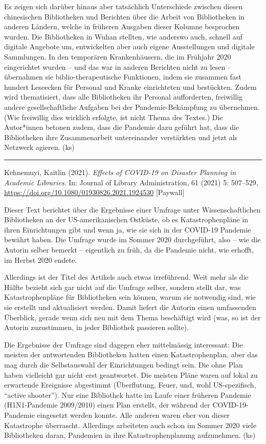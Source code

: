 \documentclass[a4paper,
fontsize=11pt,
oneside,
numbers=noperiodatend,
parskip=half-,
bibliography=totoc,
final
]{scrartcl}
\begin{document}
Es zeigen sich darüber hinaus aber tatsächlich Unterschiede zwischen
diesen chinesischen Bibliotheken und Berichten über die Arbeit von
Bibliotheken in anderen Ländern, welche in früheren Ausgaben dieser
Kolumne besprochen wurden. Die Bibliotheken in Wuhan stellten, wie
anderswo auch, schnell auf digitale Angebote um, entwickelten aber auch
eigene Ausstellungen und digitale Sammlungen. In den temporären
Krankenhäusern, die im Frühjahr 2020 eingerichtet wurden -- und das war
in anderen Berichten nicht zu lesen -- übernahmen sie
biblio-therapeutische Funktionen, indem sie zusammen fast hundert
Leseecken für Personal und Kranke einrichteten und bestückten. Zudem
wird thematisiert, dass alle Bibliotheken ihr Personal aufforderten,
freiwillig andere gesellschaftliche Aufgaben bei der Pandemie-Bekämpfung
zu übernehmen. (Wie freiwillig dies wirklich erfolgte, ist nicht Thema
des Textes.) Die Autor*innen betonen zudem, dass die Pandemie dazu
geführt hat, dass die Bibliotheken ihre Zusammenarbeit untereinander
verstärkten und jetzt als Netzwerk agieren. (ks)

\begin{center}\rule{0.5\linewidth}{0.5pt}\end{center}

Kehnemuyi, Kaitlin (2021). \emph{Effects of COVID-19 on Disaster
Planning in Academic Libraries}. In: Journal of Library Administration,
61 (2021) 5: 507--529,
\url{https://doi.org/10.1080/01930826.2021.1924530} {[}Paywall{]}

Dieser Text berichtet über die Ergebnisse einer Umfrage unter
Wissenschaftlichen Bibliotheken an der US-amerikanischen Ostküste, ob es
Katastrophenpläne in ihren Einrichtungen gibt und wenn ja, wie sie sich
in der COVID-19 Pandemie bewährt haben. Die Umfrage wurde im Sommer 2020
durchgeführt, also -- wie die Autorin selber bemerkt -- eigentlich zu
früh, da die Pandemie nicht, wie erhofft, im Herbst 2020 endete.

Allerdings ist der Titel des Artikels auch etwas irreführend. Weit mehr
als die Hälfte bezieht sich gar nicht auf die Umfrage selber, sondern
stellt dar, was Katastrophenpläne für Bibliotheken sein können, warum
sie notwendig sind, wie sie erstellt und aktualisiert werden. Damit
liefert die Autorin einen umfassenden Überblick, gerade wenn sich neu
mit dem Thema beschäftigt wird (was, so ist der Autorin zuzustimmen, in
jeder Bibliothek passieren sollte).

Die Ergebnisse der Umfrage sind dagegen eher mittelmässig interessant:
Die meisten der antwortenden Bibliotheken hatten einen Katastrophenplan,
aber das mag durch die Selbstauswahl der Einrichtungen bedingt sein. Die
ohne Plan haben vielleicht gar nicht erst geantwortet. Die meisten Pläne
waren auf lokal zu erwartende Ereignisse abgestimmt (Überflutung, Feuer,
und, wohl US-spezifisch, \enquote{active shooter}). Nur eine Bibliothek
hatte im Laufe einer früheren Pandemie (H1N1-Pandemie 2009/2010) einen
Plan erstellt, der während der COVID-19-Pandemie eingesetzt werden
konnte. Alle anderen waren eher von dieser Katastrophe überrascht.
Allerdings arbeiteten auch schon im Sommer 2020 viele Bibliotheken
daran, Pandemien in ihre Katastrophenplanung aufzunehmen. (ks)
\end{document}
